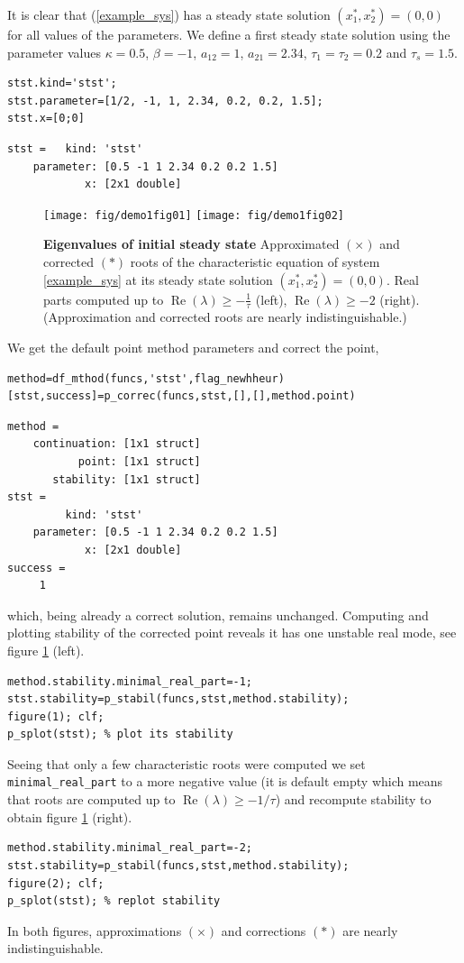 \documentclass[10pt]{scrartcl}
\renewcommand{\Re}{\operatorname{Re}}
\newcommand{\blist}[1]{\mbox{\lstinline!#1!}}
\begin{document}
It is clear that
(\ref{example_sys}) has a steady state solution $(x_1^*,x_2^*)=(0,0)$
for all values of the parameters.  We define a first steady state
solution using the parameter values $\kappa=0.5$, $\beta=-1$,
$a_{12}=1$, $a_{21}=2.34$, $\tau_1=\tau_2=0.2$ and $\tau_s=1.5$.
\begin{lstlisting}
stst.kind='stst';
stst.parameter=[1/2, -1, 1, 2.34, 0.2, 0.2, 1.5];
stst.x=[0;0]  
\end{lstlisting}
{\small
\begin{verbatim}
stst =   kind: 'stst'
    parameter: [0.5 -1 1 2.34 0.2 0.2 1.5]
            x: [2x1 double]
\end{verbatim}
}
\begin{figure}[htbp]
  \begin{center}
    \texttt{[image: fig/demo1fig01]}%
    \texttt{[image: fig/demo1fig02]}
  \end{center}
  \caption{\label{ride1+2_pic}\textbf{\textsf{Eigenvalues of initial
        steady state}} Approximated $(\times)$ and corrected $(*)$
    roots of the characteristic equation of system \eqref{example_sys}
    at its steady state solution $(x_1^*,x_2^*)=(0,0)$.  Real parts
    computed up to $\Re(\lambda)\geq -\frac{1}{\tau}$ (left),
    $\Re(\lambda)\geq -2$ (right). (Approximation and corrected roots
    are nearly indistinguishable.)}
\end{figure}
We get the default point method parameters and 
correct the point,
\begin{lstlisting}
method=df_mthod(funcs,'stst',flag_newhheur)
[stst,success]=p_correc(funcs,stst,[],[],method.point)
\end{lstlisting}
{\small
\begin{verbatim}
method = 
    continuation: [1x1 struct]
           point: [1x1 struct]
       stability: [1x1 struct]
stst = 
         kind: 'stst'
    parameter: [0.5 -1 1 2.34 0.2 0.2 1.5]
            x: [2x1 double]
success =
     1
\end{verbatim}
}
\noindent which, being already a correct solution, remains unchanged.
Computing and plotting stability of the corrected point reveals 
it has one unstable real mode, see figure \ref{ride1+2_pic} (left).
\begin{lstlisting}
method.stability.minimal_real_part=-1;
stst.stability=p_stabil(funcs,stst,method.stability);
figure(1); clf;
p_splot(stst); % plot its stability  
\end{lstlisting}
Seeing that only a few characteristic roots were computed we set
\blist{minimal_real_part} to a more negative value (it is default
empty which means that roots are computed up to
$\Re(\lambda)\geq-1/\tau$) and recompute stability to obtain figure
\ref{ride1+2_pic} (right).  
\begin{lstlisting}
method.stability.minimal_real_part=-2;
stst.stability=p_stabil(funcs,stst,method.stability);
figure(2); clf;
p_splot(stst); % replot stability  
\end{lstlisting}
\noindent In both figures, approximations $(\times)$ and corrections $(*)$
are nearly indistinguishable.
\end{document}
